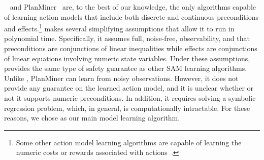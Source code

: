 \nsam~\cite{mordoch2023learning} and 
PlanMiner~\citep{segura2021discovering} are, to the best of our knowledge, the only algorithms capable of learning action models that include both discrete and continuous preconditions and effects.\footnote{Some other action model learning algorithms are capable of learning the numeric costs or rewards associated with actions~\cite{jin2022creativity}.} 
\nsam makes several simplifying assumptions that allow it to run in polynomial time.
Specifically, it assumes full, noise-free, observability, 
and that preconditions are conjunctions of linear inequalities while effects are conjunctions of linear equations involving numeric state variables. 
Under these assumptions, \nsam provides the same type of safety guarantee as other SAM learning algorithms. 
Unlike \nsam, PlanMiner can learn from noisy observations. 
However, it does not provide any guarantee on the learned action model, and it is unclear whether or not it supports numeric preconditions. 
In addition, it requires solving a symbolic regression problem, which, in general, is computationally intractable. 
For these reasons, we chose \nsam as our main model learning algorithm.


